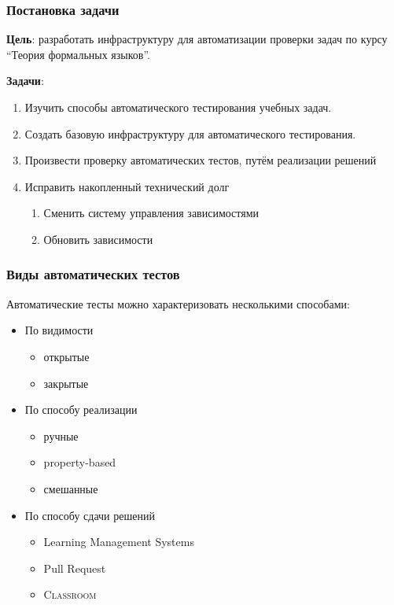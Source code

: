 \documentclass[aspectratio=169]{beamer}
\begin{document}
\begin{frame}
	\frametitle{Постановка задачи}
	\textbf{Цель}: разработать инфраструктуру для автоматизации проверки задач по курсу \enquote{Теория формальных языков}.

	\textbf{Задачи}:
	\begin{enumerate}
		\item Изучить способы автоматического тестирования учебных задач.
		\item Создать базовую инфраструктуру для автоматического тестирования.
		\item Произвести проверку автоматических тестов, путём реализации решений
		\item Исправить накопленный технический долг
		      \begin{enumerate}
			      \item Сменить систему управления зависимостями
			      \item Обновить зависимости
		      \end{enumerate}
	\end{enumerate}
\end{frame}

\begin{frame}
	\frametitle{Виды автоматических тестов}

	Автоматические тесты можно характеризовать несколькими способами:
	\begin{itemize}
		\item По видимости
		      \begin{itemize}
			      \item открытые
			      \item закрытые
		      \end{itemize}
		\item По способу реализации
		      \begin{itemize}
			      \item ручные
			      \item property-based
			      \item смешанные
		      \end{itemize}
		\item По способу сдачи решений
		      \begin{itemize}
			      \item Learning Management Systems
			      \item Pull Request
			      \item \GitHub{} \textsc{Classroom}
		      \end{itemize}
	\end{itemize}
\end{frame}
\end{document}
